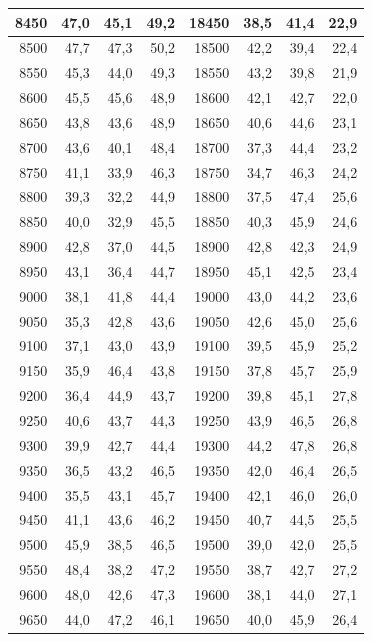 \begin{small}
\begin{longtable}{|r|r|r|r|r|r|r|r|}
8450 & 47,0 & 45,1 & 49,2 & 18450 & 38,5 & 41,4 & 22,9 \\ \hline
8500 & 47,7 & 47,3 & 50,2 & 18500 & 42,2 & 39,4 & 22,4 \\ \hline
8550 & 45,3 & 44,0 & 49,3 & 18550 & 43,2 & 39,8 & 21,9 \\ \hline
8600 & 45,5 & 45,6 & 48,9 & 18600 & 42,1 & 42,7 & 22,0 \\ \hline
8650 & 43,8 & 43,6 & 48,9 & 18650 & 40,6 & 44,6 & 23,1 \\ \hline
8700 & 43,6 & 40,1 & 48,4 & 18700 & 37,3 & 44,4 & 23,2 \\ \hline
8750 & 41,1 & 33,9 & 46,3 & 18750 & 34,7 & 46,3 & 24,2 \\ \hline
8800 & 39,3 & 32,2 & 44,9 & 18800 & 37,5 & 47,4 & 25,6 \\ \hline
8850 & 40,0 & 32,9 & 45,5 & 18850 & 40,3 & 45,9 & 24,6 \\ \hline
8900 & 42,8 & 37,0 & 44,5 & 18900 & 42,8 & 42,3 & 24,9 \\ \hline
8950 & 43,1 & 36,4 & 44,7 & 18950 & 45,1 & 42,5 & 23,4 \\ \hline
9000 & 38,1 & 41,8 & 44,4 & 19000 & 43,0 & 44,2 & 23,6 \\ \hline
9050 & 35,3 & 42,8 & 43,6 & 19050 & 42,6 & 45,0 & 25,6 \\ \hline
9100 & 37,1 & 43,0 & 43,9 & 19100 & 39,5 & 45,9 & 25,2 \\ \hline
9150 & 35,9 & 46,4 & 43,8 & 19150 & 37,8 & 45,7 & 25,9 \\ \hline
9200 & 36,4 & 44,9 & 43,7 & 19200 & 39,8 & 45,1 & 27,8 \\ \hline
9250 & 40,6 & 43,7 & 44,3 & 19250 & 43,9 & 46,5 & 26,8 \\ \hline
9300 & 39,9 & 42,7 & 44,4 & 19300 & 44,2 & 47,8 & 26,8 \\ \hline
9350 & 36,5 & 43,2 & 46,5 & 19350 & 42,0 & 46,4 & 26,5 \\ \hline
9400 & 35,5 & 43,1 & 45,7 & 19400 & 42,1 & 46,0 & 26,0 \\ \hline
9450 & 41,1 & 43,6 & 46,2 & 19450 & 40,7 & 44,5 & 25,5 \\ \hline
9500 & 45,9 & 38,5 & 46,5 & 19500 & 39,0 & 42,0 & 25,5 \\ \hline
9550 & 48,4 & 38,2 & 47,2 & 19550 & 38,7 & 42,7 & 27,2 \\ \hline
9600 & 48,0 & 42,6 & 47,3 & 19600 & 38,1 & 44,0 & 27,1 \\ \hline
9650 & 44,0 & 47,2 & 46,1 & 19650 & 40,0 & 45,9 & 26,4 \\ \hline

\end{longtable}
\end{small}
